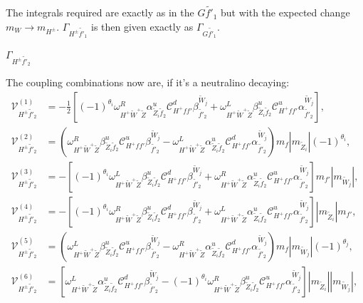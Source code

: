\documentclass[final,3p,times,pdflatex]{elsarticle}
\begin{document}
The integrals required are exactly as in the $G \tilde{f'}_1$ but with the expected change $m_{W} \rightarrow m_{H^{\pm}}$. 
$\Gamma_{H^{\pm} \tilde{f'}_1}$ is then given exactly as $\Gamma_{G \tilde{f'}_1}$.

\textbf{\underline{$\Gamma_{H^{\pm} \tilde{f'}_2}$}}

The coupling combinations now are, if it's a neutralino decaying:
\begin{align}
\mathcal{V}_{H^{\pm} \tilde{f'}_2}^{(1)} &= -\frac{1}{2}[(-1)^{\theta_i}\omega_{H^+ \tilde{W}^+ \tilde{Z}}^R \alpha_{\tilde{Z}_i \tilde{f}_2}^{u} \mathcal{C}_{H^+ f f'}^d \beta_{\tilde{f'}_2}^{\tilde{W}_j} + \omega_{H^+ \tilde{W}^+ \tilde{Z}}^L \beta_{\tilde{Z}_i \tilde{f}_2}^{u} \mathcal{C}_{H^+ f f'}^u \alpha_{\tilde{f'}_2}^{\tilde{W}_j}], \\
\mathcal{V}_{H^{\pm} \tilde{f'}_2}^{(2)} &= (\omega_{H^+ \tilde{W}^+ \tilde{Z}}^R \beta_{\tilde{Z}_i \tilde{f}_2}^{u}  \mathcal{C}_{H^+ f f'}^u \beta_{\tilde{f'}_2}^{\tilde{W}_j} - \omega_{H^+ \tilde{W}^+ \tilde{Z}}^L \alpha_{\tilde{Z}_i \tilde{f}_2}^{u} \mathcal{C}_{H^+ f f'}^d \alpha_{\tilde{f'}_2}^{\tilde{W}_j})m_{f}|m_{\tilde{Z}_i}|(-1)^{\theta_i}, \\
\mathcal{V}_{H^{\pm} \tilde{f'}_2}^{(3)} &= -[(-1)^{\theta_i}\omega_{H^+ \tilde{W}^+ \tilde{Z}}^L \beta_{\tilde{Z}_i \tilde{f}_2}^{u} \mathcal{C}_{H^+ f f'}^d \beta_{\tilde{f'}_2}^{\tilde{W}_j} +  \omega_{H^+ \tilde{W}^+ \tilde{Z}}^R \alpha_{\tilde{Z}_i \tilde{f}_2}^{u} \mathcal{C}_{H^+ f f'}^u \alpha_{\tilde{f'}_2}^{\tilde{W}_j}]m_{f'}|m_{\tilde{W}_j}|, \\
\mathcal{V}_{H^{\pm} \tilde{f'}_2}^{(4)} &= -[(-1)^{\theta_i}\omega_{H^+ \tilde{W}^+ \tilde{Z}}^R \beta_{\tilde{Z}_i \tilde{f}_2}^{u} \mathcal{C}_{H^+ f f'}^d \beta_{\tilde{f'}_2}^{\tilde{W}_j} + \omega_{H^+ \tilde{W}^+ \tilde{Z}}^L \alpha_{\tilde{Z}_i \tilde{f}_2}^{u} \mathcal{C}_{H^+ f f'}^u \alpha_{\tilde{f'}_2}^{\tilde{W}_j}]|m_{\tilde{Z}_i}|m_{f'}, \\
\mathcal{V}_{H^{\pm} \tilde{f'}_2}^{(5)} &= (\omega_{H^+ \tilde{W}^+ \tilde{Z}}^L \beta_{\tilde{Z}_i \tilde{f}_2}^{u} \mathcal{C}_{H^+ f f'}^u \beta_{\tilde{f'}_2}^{\tilde{W}_j} - \omega_{H^+ \tilde{W}^+ \tilde{Z}}^R \alpha_{\tilde{Z}_i \tilde{f}_2}^{u} \mathcal{C}_{H^+ f f'}^d \alpha_{\tilde{f'}_2}^{\tilde{W}_j})m_{f}|m_{\tilde{W}_j}|(-1)^{\theta_j}, \\
\mathcal{V}_{H^{\pm} \tilde{f'}_2}^{(6)} &= [ \omega_{H^+ \tilde{W}^+ \tilde{Z}}^L \alpha_{\tilde{Z}_i \tilde{f}_2}^{u} \mathcal{C}_{H^+ f f'}^d \beta_{\tilde{f'}_2}^{\tilde{W}_j} - (-1)^{\theta_i}\omega_{H^+ \tilde{W}^+ \tilde{Z}}^R \beta_{\tilde{Z}_i \tilde{f}_2}^{u} \mathcal{C}_{H^+ f f'}^u \alpha_{\tilde{f'}_2}^{\tilde{W}_j}]|m_{\tilde{Z}_i}||m_{\tilde{W}_j}|, \\

\end{align}
\end{document}
